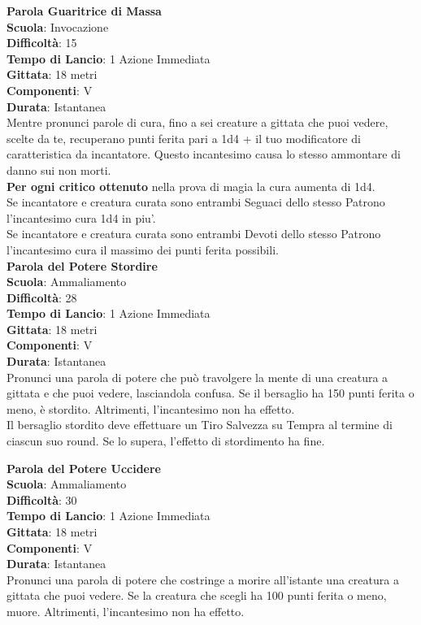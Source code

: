 \begin{multicols}{2}
\medskip\textbf{Parola Guaritrice di Massa}\\
\textbf{Scuola}: Invocazione\\
\textbf{Difficoltà}:  15\\
\textbf{Tempo di Lancio}: 1 Azione Immediata\\
\textbf{Gittata}: 18 metri\\
\textbf{Componenti}: V\\
\textbf{Durata}: Istantanea\\
Mentre pronunci parole di cura, fino a sei creature a gittata che puoi vedere, scelte da te, recuperano punti ferita pari a 1d4 + il tuo modificatore di caratteristica da incantatore. Questo incantesimo causa lo stesso ammontare di danno sui non morti.\\
\textbf{Per ogni critico ottenuto} nella prova di magia la cura aumenta di 1d4.\\
Se incantatore e creatura curata sono entrambi Seguaci dello stesso Patrono l'incantesimo cura 1d4 in piu'.\\
Se incantatore e creatura curata sono entrambi Devoti dello stesso Patrono l'incantesimo cura il massimo dei punti ferita possibili.\\
 
\medskip\textbf{Parola del Potere Stordire}\\
\textbf{Scuola}: Ammaliamento\\
\textbf{Difficoltà}:  28\\
\textbf{Tempo di Lancio}: 1 Azione Immediata\\
\textbf{Gittata}: 18 metri\\
\textbf{Componenti}: V\\
\textbf{Durata}: Istantanea\\
Pronunci una parola di potere che può travolgere la mente di una creatura a gittata e che puoi vedere, lasciandola confusa. Se il bersaglio ha 150 punti ferita o meno, è stordito. Altrimenti, l'incantesimo non ha effetto.\\
Il bersaglio stordito deve effettuare un Tiro Salvezza su Tempra al termine di ciascun suo round. Se lo supera, l’effetto di stordimento ha fine.

\medskip\textbf{Parola del Potere Uccidere}\\
\textbf{Scuola}: Ammaliamento\\
\textbf{Difficoltà}:  30\\
\textbf{Tempo di Lancio}: 1 Azione Immediata\\
\textbf{Gittata}: 18 metri\\
\textbf{Componenti}: V\\
\textbf{Durata}: Istantanea\\
Pronunci una parola di potere che costringe a morire all'istante una creatura a gittata che puoi vedere. Se la creatura che scegli ha 100 punti ferita o meno, muore. Altrimenti, l'incantesimo non ha effetto. 


\end{multicols}
